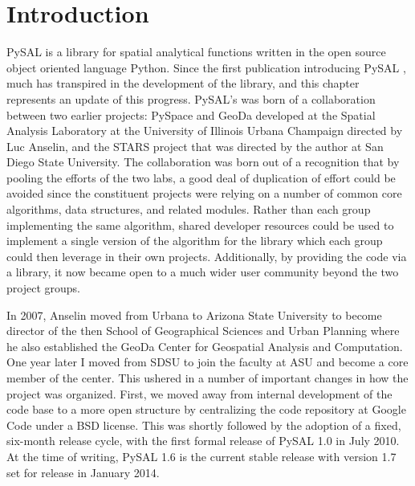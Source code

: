 \documentclass[11pt, titlepage]{article}
\begin{document}
\maketitle


\section{Introduction}
PySAL is a library for spatial analytical functions written in the open
source object oriented language Python.
Since the first publication introducing PySAL \citep{Rey:2007ox},
much has transpired in the development of the library, and this chapter
represents an update of this progress. PySAL's was born of a
collaboration between two earlier projects: PySpace and GeoDa developed
at the Spatial Analysis Laboratory at the University of Illinois Urbana
Champaign directed by Luc Anselin, and the STARS project that was
directed by the author at San Diego State University. The collaboration
was born out of a recognition that by pooling the efforts of the two
labs, a good deal of duplication of effort could be avoided since the
constituent projects were relying on a number of common core algorithms,
data structures, and related modules.  Rather than each group
implementing the same algorithm, shared developer resources could be
used to implement a single version of the algorithm for the library
which each group could then leverage in their own projects.
Additionally, by providing the code via a library, it now became open to
a much wider user community beyond the two project groups.

In 2007, Anselin moved from Urbana to Arizona State University to become
director of the then School of Geographical Sciences and Urban Planning
where he also established the GeoDa Center for Geospatial Analysis and
Computation. One year later I moved from SDSU to join the faculty at ASU
and become a core member of the center. This ushered in a number of
important changes in how the project was organized. First, we moved away
from internal development of the code base to a more open structure by
centralizing the code repository at Google Code under a BSD license.
This was shortly followed by the adoption of a fixed, six-month release
cycle, with the first formal release of PySAL 1.0 in July 2010. At the
time of writing, PySAL 1.6 is the current stable release with version
1.7 set for release in January 2014.
\end{document}
